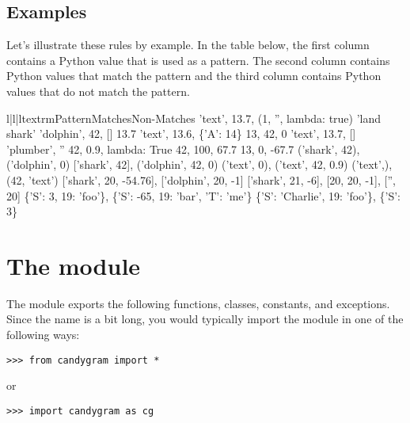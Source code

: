 \documentclass{howto}
\newcommand{\lessthan}[0]{\begin{math}<\end{math}}
\newcommand{\greaterthan}[0]{\begin{math}>\end{math}}
\newcommand{\lessthan}[0]{<}
\newcommand{\greaterthan}[0]{>}
\begin{document}
\subsection{Examples}
Let's illustrate these rules by example. In the table below, the first column
contains a Python value that is used as a pattern. The second column contains
Python values that match the pattern and the third column contains Python values
that do not match the pattern.
\begin{tableiii}{l|l|l}{textrm}{Pattern}{Matches}{Non-Matches}
	{'text', 13.7, (1, '', lambda: true)}
	{}
	{'land shark'}
	{'dolphin', 42, []}
	{13.7}
	{'text', 13.6, \{'A': 14\}}
	{13, 42, 0}
	{'text', 13.7, []}
	{'plumber', ''}
	{42, 0.9, lambda: True}
\lineiii{lambda x: x \greaterthan\ 20}
	{42, 100, 67.7}
	{13, 0, -67.7}
	{('shark', 42), ('dolphin', 0)}
	{['shark', 42], ('dolphin', 42, 0)}
	{('text', 0), ('text', 42, 0.9)}
	{('text',), (42, 'text')}
\lineiii{[str, 20, lambda x: x \lessthan\ 0]}
	{['shark', 20, -54.76], ['dolphin', 20, -1]}
	{['shark', 21, -6], [20, 20, -1], ['', 20]}
	{\{'S': 3, 19: 'foo'\}, \{'S': -65, 19: 'bar', 'T': 'me'\}}
	{\{'S': 'Charlie', 19: 'foo'\}, \{'S': 3\}}
\end{tableiii}



\section{The  module}


The  module exports the following functions, classes,
constants, and exceptions. Since the name  is a bit long, you
would typically import the module in one of the following ways:
\begin{verbatim}
>>> from candygram import *
\end{verbatim}
or
\begin{verbatim}
>>> import candygram as cg
\end{verbatim}



\end{document}
